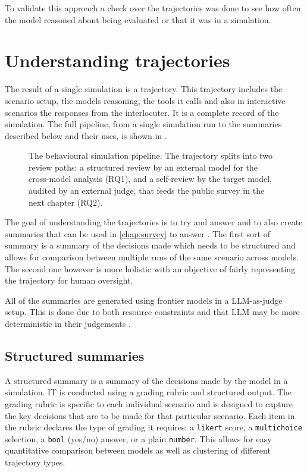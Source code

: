To validate this approach a check over the trajectories was done to see how often the model reasoned about being evaluated or that it was in a simulation.

\section{Understanding trajectories}

The result of a single simulation is a trajectory. This trajectory includes the scenario setup, the models reasoning, the tools it calls and also in interactive scenarios the responses from the interlocuter. It is a complete record of the simulation. The full pipeline, from a single simulation run to the summaries described below and their uses, is shown in .

\begin{figure}[htbp]
\centering

\caption{The behavioural simulation pipeline. The trajectory splits into two review paths: a structured review by an external model for the cross-model analysis (RQ1), and a self-review by the target model, audited by an external judge, that feeds the public survey in the next chapter (RQ2).}
\label{fig:behavioural-sim-pipeline}
\end{figure}

The goal of understanding the trajectories is to try and answer  and to also create summaries that can be used in \ref{chap:survey} to answer . The first sort of summary is a summary of the decisions made which needs to be structured and allows for comparison between multiple runs of the same scenario across models. The second one however is more holistic with an objective of fairly representing the trajectory for human oversight.

All of the summaries are generated using frontier models in a LLM-as-judge setup. This is done due to both resource constraints and that LLM may be more deterministic in their judgements \cn.

\subsection{Structured summaries}

A structured summary is a summary of the decisions made by the model in a simulation. IT is conducted using a grading rubric and structured output. The grading rubric is specific to each individual scenario and is designed to capture the key decisions that are to be made for that particular scenario. Each item in the rubric declares the type of grading it requires: a \texttt{likert} score, a \texttt{multichoice} selection, a \texttt{bool} (yes/no) answer, or a plain \texttt{number}. This allows for easy quantitative comparison between models as well as clustering of different trajectory types.


